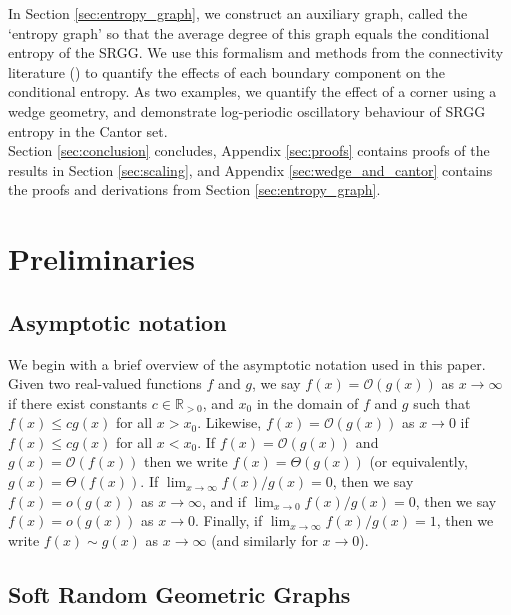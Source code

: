 \documentclass{article}
\newcommand{\tti}{\rightarrow\infty}
\newcommand{\bigO}[1]{\mathcal{O}\left(#1\right)}
\newcommand{\ttz}[0]{\rightarrow 0}
\begin{document}
In Section \ref{sec:entropy_graph}, we construct an auxiliary graph, called the `entropy graph' so that the average degree of this graph equals the conditional entropy of the SRGG. We use this formalism and methods from the connectivity literature (\cite{dettmann2016random}) to quantify the effects of each boundary component on the conditional entropy. As two examples, we quantify the effect of a corner using a wedge geometry, and demonstrate log-periodic oscillatory behaviour of SRGG entropy in the Cantor set. \\

Section \ref{sec:conclusion} concludes, Appendix \ref{sec:proofs} contains proofs of the results in Section \ref{sec:scaling}, and Appendix \ref{sec:wedge_and_cantor} contains the proofs and derivations from Section \ref{sec:entropy_graph}.


\section{Preliminaries}

\subsection{Asymptotic notation}

We begin with a brief overview of the asymptotic notation used in this paper. Given two real-valued functions $f$ and $g$, we say $f(x) = \bigO{g(x)}$ as $x\tti$ if there exist constants $c\in\mathbb{R}_{>0}$, and $x_0$ in the domain of $f$ and $g$ such that $f(x) \leq cg(x)$ for all $x > x_0$. Likewise, $f(x) = \bigO{g(x)}$ as $x \ttz$ if $f(x) \leq cg(x)$ for all $x < x_0$. If $f(x) = \bigO{g(x)}$ and $g(x) = \bigO{f(x)}$ then we write $f(x) = \Theta(g(x))$ (or equivalently, $g(x) = \Theta(f(x))$. If $\lim_{x\tti} f(x)/g(x) = 0$, then we say $f(x) = o(g(x))$ as $x \tti$, and if $\lim_{x\ttz} f(x)/g(x) = 0$, then we say $f(x) = o(g(x))$ as $x\ttz$. Finally, if $\lim_{x\tti} f(x)/g(x) = 1$, then we write $f(x) \sim g(x)$ as $x\tti$ (and similarly for $x\ttz$).

\subsection{Soft Random Geometric Graphs}
\end{document}
